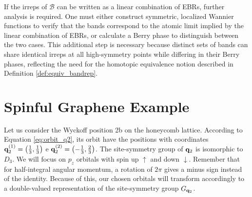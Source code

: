 If the irreps of \(\mathcal{B}\) can be written as a linear combination of EBRs, further analysis is required. One must either construct symmetric, localized Wannier functions to verify that the bands correspond to the atomic limit implied by the linear combination of EBRs, or calculate a Berry phase to distinguish between the two cases. This additional step is necessary because distinct sets of bands can share identical irreps at all high-symmetry points while differing in their Berry phases, reflecting the need for the homotopic equivalence notion described in Definition \ref{def:equiv_bandrep}.

\section{Spinful Graphene Example} \label{sec:spinful_graphene}

Let us consider the Wyckoff position 2b on the honeycomb lattice. According to Equation \ref{eq:orbit_q2}, its orbit have the positions with coordinates ${\vb{q}}_2^{(1)} = \qty(\frac{1}{3}, \frac{1}{3})$ e ${\vb{q}}_2^{(2)} = \qty(-\frac{1}{3}, \frac{2}{3})$. The site-symmetry group of ${\vb{q}}_2$ is isomorphic to $D_3$. We will focus on $p_z$ orbitals with spin up $\uparrow$ and down $\downarrow$. Remember that for half-integral angular momentum, a rotation of $2\pi$ gives a minus sign instead of the identity. Because of this, our chosen orbitals will transform accordingly to a double-valued representation of the site-symmetry group $G_{{\vb{q}}_2}$.

